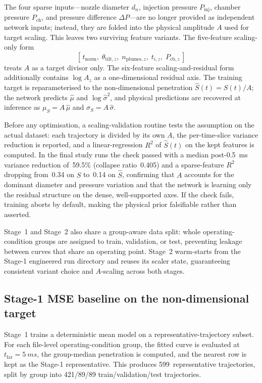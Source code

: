 \documentclass[english, 12pt, a4paper, elec, utf8, a-2b, online]{aaltothesis}
\begin{document}
The four sparse inputs---nozzle diameter \(d_n\), injection pressure \(P_{\mathrm{inj}}\), chamber pressure \(P_{\mathrm{ch}}\), and pressure difference \(\Delta P\)---are no longer provided as independent network inputs; instead, they are folded into the physical amplitude \(A\) used for target scaling. This leaves two surviving feature variants. The five-feature scaling-only form
\[
[\,t_{\mathrm{norm}},\;\theta_{\mathrm{tilt},z},\;n_{\mathrm{plumes},z},\;t_{i,z},\;P_{\mathrm{cb},z}\,]
\]
treats $A$ as a target divisor only. The six-feature scaling-and-residual form additionally contains $\log A_z$ as a one-dimensional residual axis. The training target is reparameterised to the non-dimensional penetration $\hat{S}(t)=S(t)/A$; the network predicts $\hat{\mu}$ and $\log\hat{\sigma}^2$, and physical predictions are recovered at inference as $\mu_S=A\,\hat{\mu}$ and $\sigma_S=A\,\hat{\sigma}$.

Before any optimisation, a scaling-validation routine tests the assumption on the actual dataset: each trajectory is divided by its own $A$, the per-time-slice variance reduction is reported, and a linear-regression $R^2$ of $\hat{S}(t)$ on the kept features is computed. In the final study runs the check passed with a median post-\SI{0.5}{ms} variance reduction of~59.5\% (collapse ratio~0.405) and a sparse-feature $R^2$ dropping from~0.34 on $S$ to~0.14 on $\hat{S}$, confirming that $A$ accounts for the dominant diameter and pressure variation and that the network is learning only the residual structure on the dense, well-supported axes. If the check fails, training aborts by default, making the physical prior falsifiable rather than asserted.

Stage~1 and Stage~2 also share a group-aware data split: whole operating-condition groups are assigned to train, validation, or test, preventing leakage between curves that share an operating point. Stage~2 warm-starts from the Stage-1 engineered run directory and reuses its scaler state, guaranteeing consistent variant choice and $A$-scaling across both stages.

\subsection{Stage-1 MSE baseline on the non-dimensional target}

Stage~1 trains a deterministic mean model on a representative-trajectory subset. For each file-level operating-condition group, the fitted curve is evaluated at $t_{\mathrm{far}}=\SI{5}{ms}$, the group-median penetration is computed, and the nearest row is kept as the Stage-1 representative. This produces 599~representative trajectories, split by group into 421/89/89 train/validation/test trajectories.
\end{document}
